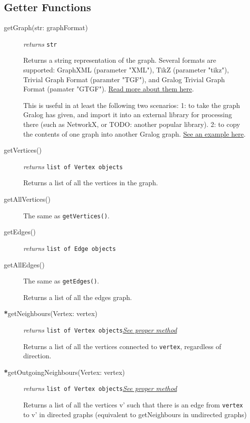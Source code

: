 \subsection{Getter Functions}
\begin{description}
\item[getGraph(str: graphFormat)]\emph{returns}
  \texttt{str}

Returns a string representation of the graph. Several formats are supported: GraphXML (parameter "XML"), TikZ (parameter "tikz"), Trivial Graph Format (paramter "TGF"), and Gralog Trivial Graph Format (pamater "GTGF"). \hyperref[graphFormatsInDetail]{Read more about them here}.

This is useful in at least the following two scenarios: 1: to take the graph Gralog has given, and import it into an external library for processing there (such as NetworkX, or TODO: another popular library). 2: to copy the contents of one graph into another Gralog graph. \hyperref[getGraphExample]{See an example here}.


\item[getVertices()]\emph{returns}
  \texttt{list of Vertex objects}

Returns a list of all the vertices in the graph.

\item[getAllVertices()]

  The same as \texttt{getVertices()}.


\item[getEdges()]\emph{returns}
  \texttt{list of Edge objects}

\item[getAllEdges()]

  The same as \texttt{getEdges()}.

  
Returns a list of all the edges graph.

\item[\textbf{*}getNeighbours(Vertex: vertex)]\emph{returns} \texttt{list of Vertex objects}\quad \hyperref[getNeighboursClass]{\textit{See proper method}}

Returns a list of all the vertices connected to \texttt{vertex}, regardless of direction.

\item[\textbf{*}getOutgoingNeighbours(Vertex: vertex)]\emph{returns} \texttt{list of Vertex objects}\quad \hyperref[getOutgoingNeighboursClass]{\textit{See proper method}}

Returns a list of all the vertices v' such that there is an edge from \texttt{vertex} to v' in directed graphs (equivalent to getNeighbours in undirected graphs)


\end{description}
